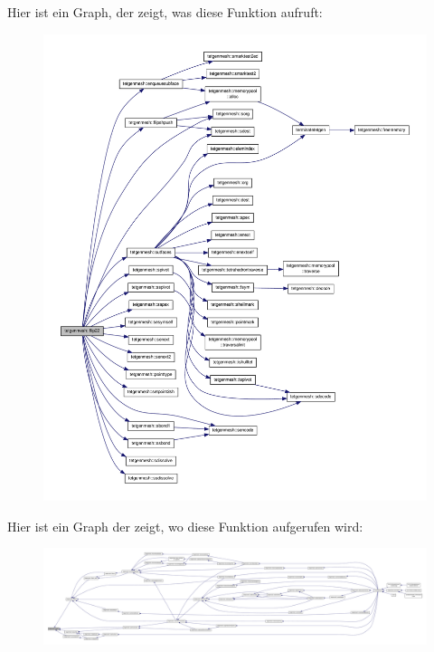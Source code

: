 Hier ist ein Graph, der zeigt, was diese Funktion aufruft\-:\nopagebreak
\begin{figure}[H]
\begin{center}
\leavevmode
\includegraphics[width=350pt]{classtetgenmesh_ac34f0cd148accd132b491f9c6145c6f6_cgraph}
\end{center}
\end{figure}




Hier ist ein Graph der zeigt, wo diese Funktion aufgerufen wird\-:\nopagebreak
\begin{figure}[H]
\begin{center}
\leavevmode
\includegraphics[width=350pt]{classtetgenmesh_ac34f0cd148accd132b491f9c6145c6f6_icgraph}
\end{center}
\end{figure}


